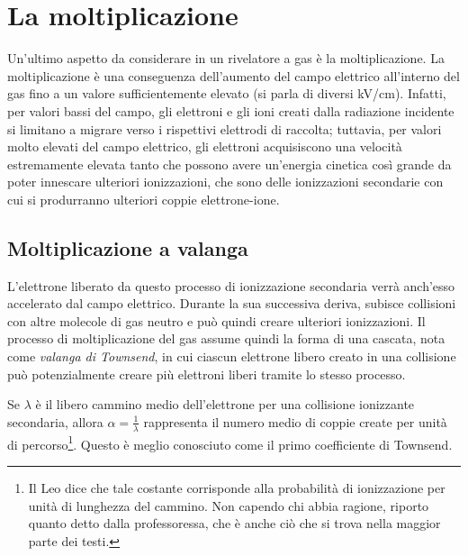 \section{La moltiplicazione}

Un'ultimo aspetto da considerare in un rivelatore a gas è la moltiplicazione. La moltiplicazione è una conseguenza dell'aumento del campo elettrico all'interno del gas fino a un valore sufficientemente elevato (si parla di diversi kV/cm). Infatti, per valori bassi del campo, gli elettroni e gli ioni creati dalla radiazione incidente si limitano a migrare verso i rispettivi elettrodi di raccolta; tuttavia, per valori molto elevati del campo elettrico, gli elettroni acquisiscono una velocità estremamente elevata tanto che possono avere un'energia cinetica così grande da poter innescare ulteriori ionizzazioni, che sono delle ionizzazioni secondarie con cui si produrranno ulteriori coppie elettrone-ione.

\subsection{Moltiplicazione a valanga}
L'elettrone liberato da questo processo di ionizzazione secondaria verrà anch'esso accelerato dal campo elettrico. Durante la sua successiva deriva, subisce collisioni con altre molecole di gas neutro e può quindi creare ulteriori ionizzazioni. Il processo di moltiplicazione del gas assume quindi la forma di una cascata, nota come \textit{valanga di Townsend}, in cui ciascun elettrone libero creato in una collisione può potenzialmente creare più elettroni liberi tramite lo stesso processo.


Se $\lambda$ è il libero cammino medio dell'elettrone per una collisione ionizzante secondaria, allora $\alpha=\frac{1}{\lambda}$ rappresenta il numero medio di coppie create per unità di percorso\footnote{Il Leo dice che tale costante corrisponde alla probabilità di ionizzazione per unità di lunghezza del cammino. Non capendo chi abbia ragione, riporto quanto detto dalla professoressa, che è anche ciò che si trova nella maggior parte dei testi.}. Questo è meglio conosciuto come il primo coefficiente di Townsend.

